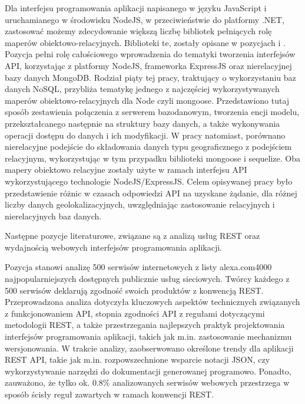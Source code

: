 Dla interfejsu programowania aplikacji napisanego w języku JavaScript i uruchamianego w środowisku NodeJS, w przeciwieństwie do platformy .NET, zastosować możemy zdecydowanie większą liczbę bibliotek pełniących rolę maperów obiektowo-relacyjnych. Biblioteki te, zostały opisane w pozycjach \cite{bojinov2018restful} i \cite{laksono2018testing}. Pozycja \cite{bojinov2018restful} pełni rolę całościowego wprowadzenia do tematyki tworzenia interfejsów API, korzystając z platformy NodeJS, frameworka ExpressJS oraz nierelacyjnej bazy danych MongoDB. Rodział piąty tej pracy, traktujący o wykorzystaniu baz danych NoSQL, przybliża tematykę jednego z najczęściej wykorzystywanych maperów obiektowo-relacyjnych dla Node czyli mongoose. Przedstawiono tutaj sposób zestawienia połączenia z serwerem bazodanowym, tworzenia encji modelu, przekształcanego następnie na struktury bazy danych, a także wykonywania operacji dostępu do danych i ich modyfikacji. W pracy \cite{laksono2018testing} natomiast, porównano nierelacyjne podejście do składowania danych typu geograficznego z podejściem relacyjnym, wykorzystując w tym przypadku biblioteki mongoose i sequelize. Oba mapery obiektowo relacyjne zostały użyte w ramach interfejsu API wykorzystującego technologie NodeJS/ExpressJS. Celem opisywanej pracy było przedstawienie różnic w czasach odpowiedzi API na uzyskane żądanie, dla różnej liczby danych geolokalizacyjnych, uwzględniając zastosowanie relacyjnych i nierelacyjnych baz danych.

Następne pozycje literaturowe, związane są z analizą usług REST oraz wydajnością webowych interfejsów programowania aplikacji.

Pozycja \cite{neumann2018analysis} stanowi analizę 500 serwisów internetowych z listy alexa.com4000 najpopularniejszych dostępnych publicznie usług sieciowych. Twórcy każdego z 500 serwisów deklarują zgodność swoich produktów z konwencją REST. Przeprowadzona analiza dotyczyła kluczowych aspektów technicznych związanych z funkcjonowaniem API, stopnia zgodności API z regułami dotyczącymi metodologii REST, a także przestrzegania najlepszych praktyk projektowania interfejsów programowania aplikacji, takich jak m.in. zastosowanie mechanizmu wersjonowania. W trakcie analizy, zaobserwowano określone trendy dla aplikacji REST API, takie jak m.in. rozpowszechnione wsparcie notacji JSON, czy wykorzystywanie narzędzi do dokumentacji generowanej programowo. Ponadto, zauważono, że tylko ok. 0.8\% analizowanych serwisów webowych przestrzega w sposób ścisły reguł zawartych w ramach konwencji REST.

